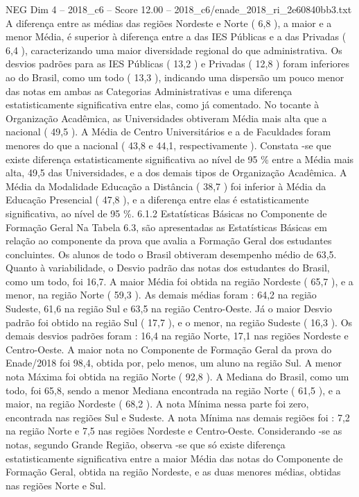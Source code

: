 \begin{textsample}{NEG Dim 4 – 2018\_c6 – Score 12.00 – 2018\_c6/enade\_2018\_ri\_2e60840bb3.txt}
A diferença entre as médias das regiões Nordeste e Norte ( 6,8 ), a maior e a menor Média, é superior à diferença entre a das IES Públicas e a das Privadas ( 6,4 ), caracterizando uma maior diversidade regional do que administrativa.
Os desvios padrões para as IES Públicas ( 13,2 ) e Privadas ( 12,8 ) foram inferiores ao do Brasil, como um todo ( 13,3 ), indicando uma dispersão um pouco menor das notas em ambas as Categorias Administrativas e uma diferença estatisticamente significativa entre elas, como já comentado.
No tocante à Organização Acadêmica, as Universidades obtiveram Média mais alta que a nacional ( 49,5 ).
A Média de Centro Universitários e a de Faculdades foram menores do que a nacional ( 43,8 e 44,1, respectivamente ).
Constata -se que existe diferença estatisticamente significativa ao nível de 95 \% entre a Média mais alta, 49,5 das Universidades, e a dos demais tipos de Organização Acadêmica.
A Média da Modalidade Educação a Distância ( 38,7 ) foi inferior à Média da Educação Presencial ( 47,8 ), e a diferença entre elas é estatisticamente significativa, ao nível de 95 \%. 6.1.2 Estatísticas Básicas no Componente de Formação Geral Na Tabela 6.3, são apresentadas as Estatísticas Básicas em relação ao componente da prova que avalia a Formação Geral dos estudantes concluintes.
Os alunos de todo o Brasil obtiveram desempenho médio de 63,5.
Quanto à variabilidade, o Desvio padrão das notas dos estudantes do Brasil, como um todo, foi 16,7.
A maior Média foi obtida na região Nordeste ( 65,7 ), e a menor, na região Norte ( 59,3 ).
As demais médias foram : 64,2 na região Sudeste, 61,6 na região Sul e 63,5 na região Centro-Oeste.
Já o maior Desvio padrão foi obtido na região Sul ( 17,7 ), e o menor, na região Sudeste ( 16,3 ).
Os demais desvios padrões foram : 16,4 na região Norte, 17,1 nas regiões Nordeste e Centro-Oeste.
A maior nota no Componente de Formação Geral da prova do Enade/2018 foi 98,4, obtida por, pelo menos, um aluno na região Sul.
A menor nota Máxima foi obtida na região Norte ( 92,8 ).
A Mediana do Brasil, como um todo, foi 65,8, sendo a menor Mediana encontrada na região Norte ( 61,5 ), e a maior, na região Nordeste ( 68,2 ).
A nota Mínima nessa parte foi zero, encontrada nas regiões Sul e Sudeste.
A nota Mínima nas demais regiões foi : 7,2 na região Norte e 7,5 nas regiões Nordeste e Centro-Oeste.
Considerando -se as notas, segundo Grande Região, observa -se que só existe diferença estatisticamente significativa entre a maior Média das notas do Componente de Formação Geral, obtida na região Nordeste, e as duas menores médias, obtidas nas regiões Norte e Sul.

\end{textsample}
